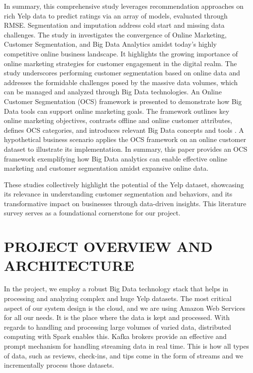 \documentclass[conference]{IEEEtran}
\begin{document}
In summary, this comprehensive study leverages recommendation approaches on rich Yelp data to predict ratings via an array of models, evaluated through RMSE. Segmentation and imputation address cold start and missing data challenges.
The study in \cite{fotaki} investigates the convergence of Online Marketing, Customer Segmentation, and Big Data Analytics amidst today's highly competitive online business landscape. It highlights the growing importance of online marketing strategies for customer engagement in the digital realm. The study underscores performing customer segmentation based on online data and addresses the formidable challenges posed by the massive data volumes, which can be managed and analyzed through Big Data technologies. An Online Customer Segmentation (OCS) framework is presented to demonstrate how Big Data tools can support online marketing goals. The framework outlines key online marketing objectives, contrasts offline and online customer attributes, defines OCS categories, and introduces relevant Big Data concepts and tools \cite{analytics}. A hypothetical business scenario applies the OCS framework on an online customer dataset to illustrate its implementation. In summary, this paper provides an OCS framework exemplifying how Big Data analytics can enable effective online marketing and customer segmentation amidst expansive online data.

These studies collectively highlight the potential of the Yelp dataset, showcasing its relevance in understanding customer segmentation and behaviors, and its transformative impact on businesses through data-driven insights. This literature survey serves as a foundational cornerstone for our project.





\section{PROJECT OVERVIEW AND ARCHITECTURE}
In the project, we employ a robust Big Data technology stack that helps in processing and analyzing complex and huge Yelp datasets. The most critical aspect of our system design is the cloud, and we are using Amazon Web Services for all our needs. It is the place where the data is kept and processed. With regards to handling and processing large volumes of varied data, distributed computing with Spark enables this. Kafka brokers provide an effective and prompt mechanism for handling streaming data in real time. This is how all types of data, such as reviews, check-ins, and tips come in the form of streams and we incrementally process those datasets.
\end{document}
